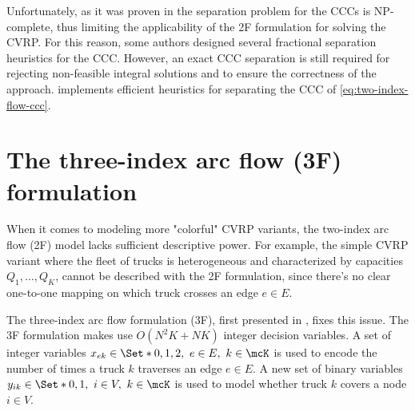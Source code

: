 Unfortunately, as it was proven in \textcite{augerat1995}
the separation problem for the CCCs is NP-complete,
thus limiting the applicability of the 2F formulation for solving the CVRP.
For this reason, some authors \parencite{augerat1995, augerat1998, ralphs2003} designed
several fractional separation heuristics for the CCC.
However,
an exact CCC separation is still required
for rejecting non-feasible integral solutions
and to ensure the correctness of the approach.
\textcite{lysgaard2003cvrpsep} implements efficient
heuristics for separating the CCC of \cref{eq:two-index-flow-ccc}.

\section{The three-index arc flow (3F) formulation}
\label{sec:cvrp-three-index-flow-formulation}

When it comes to modeling more "colorful" CVRP variants,
the two-index arc flow (2F) model lacks sufficient descriptive power.
For example,
the simple CVRP variant where the fleet of trucks is heterogeneous
and characterized by capacities $Q_1, \dots, Q_K$,
cannot be described with the 2F formulation,
since there's no clear one-to-one mapping on which truck crosses an edge $e \in E$.

The three-index arc flow formulation (3F),
first presented in \textcite{golden1977},
fixes this issue.
The 3F formulation makes use $O(N^2 K + N K)$ integer decision variables.
A set of integer variables $x_{ek} \in \Set*{0, 1, 2},\ e \in E,\ k \in \mcK$
is used to encode the number of times a truck $k$ traverses an edge $e \in E$.
A new set of binary variables $y_{ik} \in \Set*{0, 1},\ i \in V,\ k \in \mcK$
is used to model whether truck $k$ covers a node $i \in V$.

